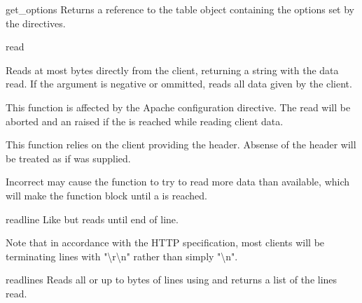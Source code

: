 \begin{methoddesc}[Request]{get_options}{}
Returns a reference to the table object containing the options set by
the  directives.
\end{methoddesc}


\begin{methoddesc}[Request]{read}{}

Reads at most  bytes directly from the client, returning a
string with the data read. If the  argument is negative or
ommitted, reads all data given by the client.

This function is affected by the  Apache configuration
directive. The read will be aborted and an  raised
if the  is reached while reading client data.

This function relies on the client providing the 
header. Absense of the  header will be treated as
if  was supplied.

Incorrect  may cause the function to try to read
more data than available, which will make the function block until a
 is reached.

\end{methoddesc}

\begin{methoddesc}[Request]{readline}{}
Like  but reads until end of line. 
                  
Note that in accordance with the HTTP specification, most clients will
be terminating lines with "\textbackslash r\textbackslash n" rather
than simply "\textbackslash n".

\end{methoddesc}

\begin{methoddesc}[Request]{readlines}{}
Reads all or up to  bytes of lines using
 and returns a list of the lines read.
\end{methoddesc}

